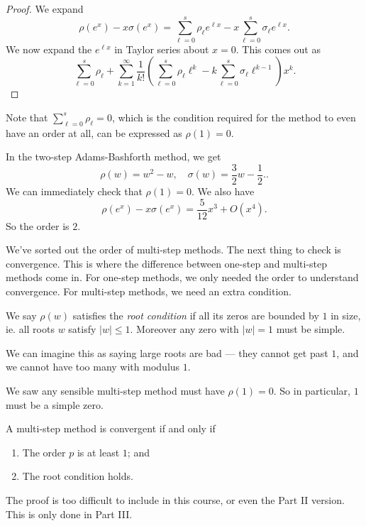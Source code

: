 \documentclass[a4paper]{article}
\begin{document}
\begin{proof}
  We expand
  \[
    \rho(e^x) - x \sigma(e^x) = \sum_{\ell = 0}^s \rho_\ell e^{\ell x} - x \sum_{\ell = 0}^s \sigma_\ell e^{\ell x}.
  \]
  We now expand the $e^{\ell x}$ in Taylor series about $x = 0$. This comes out as
  \[
    \sum_{\ell = 0}^s \rho_\ell + \sum_{k = 1}^\infty \frac{1}{k!} \left(\sum_{\ell = 0}^s \rho_\ell \ell^k - k \sum_{\ell = 0}^s \sigma_\ell \ell^{k - 1}\right) x^k.
  \]
\end{proof}
Note that $\sum_{\ell = 0}^s \rho_\ell = 0$, which is the condition required for the method to even have an order at all, can be expressed as $\rho(1) = 0$.

\begin{eg}[AB2]
  In the two-step Adams-Bashforth method, we get
  \[
    \rho(w) = w^2 - w,\quad \sigma(w) = \frac{3}{2} w - \frac{1}{2}..
  \]
  We can immediately check that $\rho(1) = 0$. We also have
  \[
    \rho(e^x) - x \sigma(e^x) = \frac{5}{12} x^3 + O(x^4).
  \]
  So the order is $2$.
\end{eg}

We've sorted out the order of multi-step methods. The next thing to check is convergence. This is where the difference between one-step and multi-step methods come in. For one-step methods, we only needed the order to understand convergence. For multi-step methods, we need an extra condition.

\begin{defi}
  We say $\rho(w)$ satisfies the \emph{root condition} if all its zeros are bounded by $1$ in size, ie. all roots $w$ satisfy $|w| \leq 1$. Moreover any zero with $|w| = 1$ must be simple.
\end{defi}
We can imagine this as saying large roots are bad --- they cannot get past $1$, and we cannot have too many with modulus $1$.

We saw any sensible multi-step method must have $\rho(1) = 0$. So in particular, $1$ must be a simple zero.

\begin{thm}
  A multi-step method is convergent if and only if
  \begin{enumerate}
    \item The order $p$ is at least $1$; and
    \item The root condition holds.
  \end{enumerate}
\end{thm}
The proof is too difficult to include in this course, or even the Part II version. This is only done in Part III.
\end{document}
